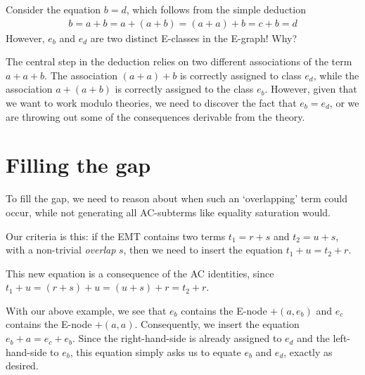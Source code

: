 \documentclass[12pt,a4paper,twoside,openright]{report}
\numberwithin{equation}{chapter}		%
\numberwithin{figure}{chapter}			%
\numberwithin{table}{chapter}			%
\theoremstyle{definition}
\theoremstyle{plain}
\begin{document}
Consider the equation $b = d$, which follows from the simple deduction
\begin{align*}
	b = a + b = a + (a + b) = (a + a) + b = c + b = d
\end{align*}
However, $e_b$ and $e_d$ are two distinct E-classes in the E-graph! Why?

The central step in the deduction relies on two different associations of the term $a + a + b$. The association $(a + a) + b$ is correctly assigned to class $e_d$, while the association $a + (a + b)$ is correctly assigned to the class $e_b$. However, given that we want to work modulo theories, we need to discover the fact that $e_b = e_d$, or we are throwing out some of the consequences derivable from the theory.

\section{Filling the gap} \label{gapfill}
To fill the gap, we need to reason about when such an `overlapping' term could occur, while not generating all AC-subterms like equality saturation would.

Our criteria is this: if the EMT contains two terms $t_1 = r + s$ and $t_2 = u + s$, with a non-trivial \emph{overlap} $s$, then we need to insert the equation $t_1 + u = t_2 + r$.

This new equation is a consequence of the AC identities, since $t_1 + u = (r + s) + u = (u + s) + r = t_2 + r$.

With our above example, we see that $e_b$ contains the E-node $+(a, e_b)$ and $e_c$ contains the E-node $+(a, a)$. Consequently, we insert the equation $e_b + a = e_c + e_b$. Since the right-hand-side is already assigned to $e_d$ and the left-hand-side to $e_b$, this equation simply asks us to equate $e_b$ and $e_d$, exactly as desired.
\end{document}
